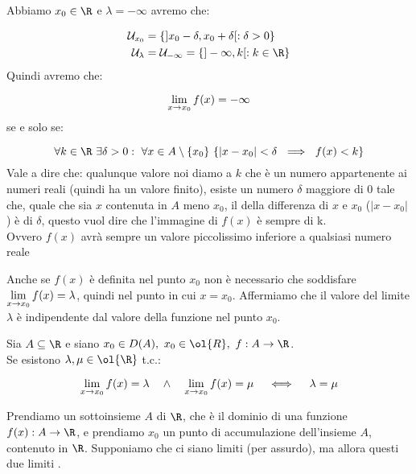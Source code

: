 \documentclass[../analisi.tex]{subfiles}
\begin{document}
\begin{esem}
Abbiamo $x_0 \in \R$ e $ \lambda = - \infty$ avremo che:

\begin{equation}
	\begin{aligned}
	\mathcal{U}_{x_0} &= \{ ] x_0 - \delta, x_0 + \delta[ : \delta > 0\}\\
	\mathcal{U}_{\lambda} &= \mathcal{U}_{- \infty} = \{
	] -\infty, k [: k \in \R \}	
	\end{aligned}
\end{equation}
Quindi avremo che:

\begin{equation}
	\lim \limits_{x \to x_0} f(x) = - \infty
\end{equation}
se e solo se:

\begin{equation}
	\forall k \in \R\ \exists \delta > 0 :\ \forall x \in A \setminus \{
	x_0 \} \ \{ | x - x_0 | < \delta\ \implies\ f(x) < k\}
\end{equation}
Vale a dire che: qualunque valore noi diamo a $k$ che è un numero appartenente 
ai numeri reali (quindi ha un valore finito), esiste un  numero $\delta$ maggiore di
0 tale che, quale che sia $x$ contenuta in $A$ meno $x_0$, il  della
differenza di $x$ e $x_0$ ($| x - x_0 |$) è  di $\delta$, questo vuol
dire che l'immagine di $f(x)$ è sempre  di k.\\
Ovvero $f(x)$ avrà sempre un valore piccolissimo inferiore a qualsiasi numero reale

\end{esem}

Anche se $f(x)$ è definita nel punto $x_0$ non è necessario
che  soddisfare $\lim \limits_{x \to x_0} f(x) = \lambda$, quindi nel punto in cui 
$x = x_0$. Affermiamo che il valore del limite $\lambda$ è indipendente 
dal valore della funzione nel punto $x_0$.

\begin{defn}
Sia $\acr$ e siano $x_0 \in D(A),\ x_0 \in \ol{R},\ f: A \to \R$. \\
Se esistono $ \lambda, \mu \in \ol{\R}$ t.c.:


\begin{equation}
	\lim \limits_{x \to x_0} f(x) = \lambda \quad \land \quad  \lim \limits_{x \to x_0} f(x) = \mu \quad 
	\iff \quad \lambda = \mu
\end{equation}
\end{defn}
Prendiamo un sottoinsieme $A$ di $\R$, che è il dominio di una funzione $f(x): A 
\to \R$, e prendiamo $x_0$ un punto di accumulazione dell'insieme $A$, contenuto 
in $\R$. Supponiamo che ci siano  limiti  (per assurdo), ma allora questi 
due limiti .

\end{document}
